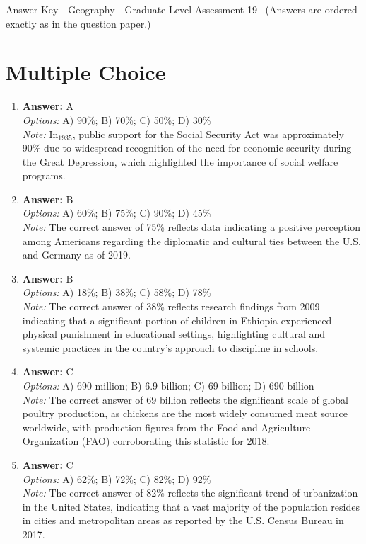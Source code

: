 \documentclass[12pt]{article}
\begin{document}
\begin{center}
Answer Key - Geography - Graduate Level Assessment 19 \
\small (Answers are ordered exactly as in the question paper.)
\end{center}

\section*{Multiple Choice}
\begin{enumerate}[label=\arabic*.]
\item \textbf{Answer:} A
\\ \textit{Options:} A) 90\%; B) 70\%; C) 50\%; D) 30\%
\\ \textit{Note:} In$_{1935}$, public support for the Social Security Act was approximately 90\% due to widespread recognition of the need for economic security during the Great Depression, which highlighted the importance of social welfare programs.
\item \textbf{Answer:} B
\\ \textit{Options:} A) 60\%; B) 75\%; C) 90\%; D) 45\%
\\ \textit{Note:} The correct answer of 75\% reflects data indicating a positive perception among Americans regarding the diplomatic and cultural ties between the U.S. and Germany as of 2019.
\item \textbf{Answer:} B
\\ \textit{Options:} A) 18\%; B) 38\%; C) 58\%; D) 78\%
\\ \textit{Note:} The correct answer of 38\% reflects research findings from 2009 indicating that a significant portion of children in Ethiopia experienced physical punishment in educational settings, highlighting cultural and systemic practices in the country's approach to discipline in schools.
\item \textbf{Answer:} C
\\ \textit{Options:} A) 690 million; B) 6.9 billion; C) 69 billion; D) 690 billion
\\ \textit{Note:} The correct answer of 69 billion reflects the significant scale of global poultry production, as chickens are the most widely consumed meat source worldwide, with production figures from the Food and Agriculture Organization (FAO) corroborating this statistic for 2018.
\item \textbf{Answer:} C
\\ \textit{Options:} A) 62\%; B) 72\%; C) 82\%; D) 92\%
\\ \textit{Note:} The correct answer of 82\% reflects the significant trend of urbanization in the United States, indicating that a vast majority of the population resides in cities and metropolitan areas as reported by the U.S. Census Bureau in 2017.
\end{enumerate}
\end{document}
